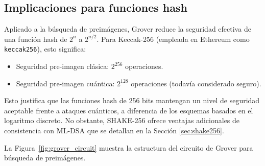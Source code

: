 \subsection{Implicaciones para funciones hash}

Aplicado a la búsqueda de preimágenes, Grover reduce la seguridad efectiva de una función hash de $2^n$ a $2^{n/2}$. Para Keccak-256 (empleada en Ethereum como \texttt{keccak256}), esto significa:
\begin{itemize}
  \item Seguridad pre-imagen clásica: $2^{256}$ operaciones.
  \item Seguridad pre-imagen cuántica: $2^{128}$ operaciones (todavía considerado seguro).
\end{itemize}

Esto justifica que las funciones hash de 256 bits mantengan un nivel de seguridad aceptable frente a ataques cuánticos, a diferencia de los esquemas basados en el logaritmo discreto. No obstante, SHAKE-256 ofrece ventajas adicionales de consistencia con ML-DSA que se detallan en la Sección \ref{sec:shake256}.

La Figura~\ref{fig:grover_circuit} muestra la estructura del circuito de Grover para búsqueda de preimágenes.

